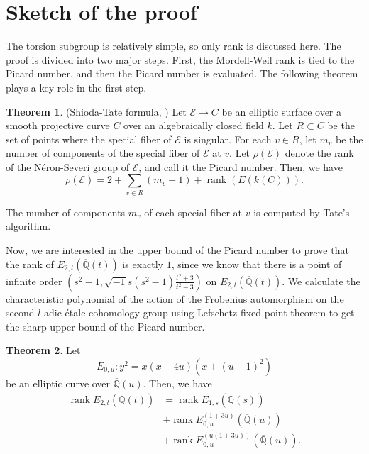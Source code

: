 \documentclass[a4paper]{jarticle} %
\theoremstyle{definition}
\newtheorem{thm}{Theorem}[section]
\theoremstyle{remark}
\DeclareMathOperator{\rank}{rank}
\newcommand{\Neron}{N\'eron}
\begin{document}
\section{Sketch of the proof}
The torsion subgroup is relatively simple, so only rank is discussed here.
The proof is divided into two major steps.
First, the Mordell-Weil rank is tied to the Picard number, and then the Picard number is evaluated.
The following theorem plays a key role in the first step.
\begin{thm}{(Shioda-Tate formula, \cite[Corollary 5.3]{ref:shioda1990})}
    \label{thm:shioda}
    Let $\mathcal{E} \to C$ be an elliptic surface over a smooth projective curve $C$ over an algebraically closed field $k$.
    Let $R \subset C$ be the set of points where the special fiber of $\mathcal{E}$ is singular.
    For each $v \in R$, let $m_{v}$ be the number of components of the special fiber of $\mathcal{E}$ at $v$.
    Let $\rho(\mathcal{E})$ denote the rank of the \Neron-Severi group of $\mathcal{E}$, and call it the Picard number.
    Then, we have
    \begin{equation*}
        \rho (\mathcal{E}) = 2 + \sum_{v \in R} (m_{v} - 1) + \rank(E(k(C))).
    \end{equation*}
\end{thm}
\vspace{1em}

The number of components $m_v$ of each special fiber at $v$ is computed by Tate's algorithm.

Now, we are interested in the upper bound of the Picard number to prove that the rank of $E_{2,t}(\overline{\mathbb{Q}}(t))$ is exactly $1$, since we know that there is a point of infinite order $(s^{2} - 1, \sqrt{-1} s(s^{2} - 1) \frac{t^{2} + 3}{t^{2} - 3} )$ on $E_{2,t}(\overline{\mathbb{Q}}(t))$.
We calculate the characteristic polynomial of the action of the Frobenius automorphism on the second $l$-adic \'etale cohomology group using Lefschetz fixed point theorem to get the sharp upper bound of the Picard number.

\begin{thm}
    Let
    \begin{equation*}
        E_{0,u}: y^{2} = x(x - 4u)(x + (u - 1)^{2})
    \end{equation*}
    be an elliptic curve over $\overline{\mathbb{Q}}(u)$.
    Then, we have
    \vspace{1em}
    \begin{equation*}
        \label{eq:rankdecomposition}
        \begin{aligned}
            \rank E_{2,t}(\overline{\mathbb{Q}}(t)) & = \rank E_{1,s}(\overline{\mathbb{Q}}(s))                \\
                                                    & + \rank E_{0,u}^{(1 + 3u)}(\overline{\mathbb{Q}}(u))     \\
                                                    & + \rank E_{0,u}^{(u(1 + 3u))}(\overline{\mathbb{Q}}(u)).
        \end{aligned}
    \end{equation*}
    \vspace{1em}
\end{thm}
\end{document}
